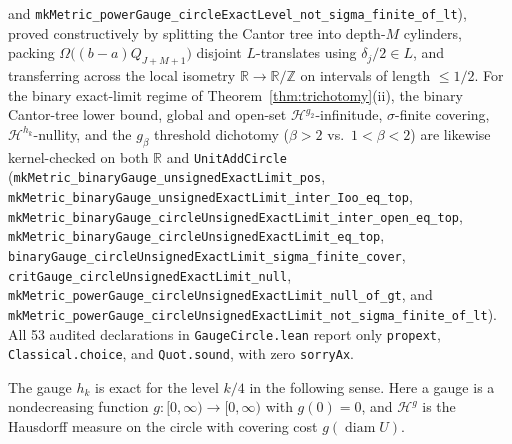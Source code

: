 \documentclass[11pt]{article}
\theoremstyle{definition}
\theoremstyle{remark}
\newcommand{\R}{\mathbb{R}}
\newcommand{\Z}{\mathbb{Z}}
\begin{document}
and
\texttt{mkMetric\_\allowbreak powerGauge\_\allowbreak circleExactLevel\_\allowbreak not\_\allowbreak sigma\_\allowbreak finite\_\allowbreak of\_\allowbreak lt}),
proved constructively by splitting the Cantor tree into depth-$M$ cylinders,
packing $\Omega\bigl((b-a)Q_{J+M+1}\bigr)$ disjoint $L$-translates using
$\delta_j/2\in L$, and transferring across the local isometry
$\R\to\R/\Z$ on intervals of length $\le1/2$. For the binary exact-limit
regime of Theorem~\ref{thm:trichotomy}(ii), the binary Cantor-tree lower bound,
global and open-set $\mathcal H^{g_2}$-infinitude, $\sigma$-finite covering,
$\mathcal H^{h_k}$-nullity, and the $g_\beta$ threshold dichotomy ($\beta>2$ vs.\
$1<\beta<2$) are likewise kernel-checked on both $\R$ and \texttt{UnitAddCircle}
(\texttt{mkMetric\_\allowbreak binaryGauge\_\allowbreak unsigned\allowbreak ExactLimit\_\allowbreak pos},
\texttt{mkMetric\_\allowbreak binaryGauge\_\allowbreak unsigned\allowbreak ExactLimit\_\allowbreak inter\_\allowbreak Ioo\_\allowbreak eq\_\allowbreak top},
\texttt{mkMetric\_\allowbreak binaryGauge\_\allowbreak circle\allowbreak Unsigned\allowbreak ExactLimit\_\allowbreak inter\_\allowbreak open\_\allowbreak eq\_\allowbreak top},
\texttt{mkMetric\_\allowbreak binaryGauge\_\allowbreak circle\allowbreak Unsigned\allowbreak ExactLimit\_\allowbreak eq\_\allowbreak top},
\texttt{binaryGauge\_\allowbreak circle\allowbreak Unsigned\allowbreak ExactLimit\_\allowbreak sigma\_\allowbreak finite\_\allowbreak cover},
\texttt{critGauge\_\allowbreak circle\allowbreak Unsigned\allowbreak ExactLimit\_\allowbreak null},
\texttt{mkMetric\_\allowbreak powerGauge\_\allowbreak circle\allowbreak Unsigned\allowbreak ExactLimit\_\allowbreak null\_\allowbreak of\_\allowbreak gt},
and
\texttt{mkMetric\_\allowbreak powerGauge\_\allowbreak circle\allowbreak Unsigned\allowbreak ExactLimit\_\allowbreak not\_\allowbreak sigma\_\allowbreak finite\_\allowbreak of\_\allowbreak lt}).
All 53 audited declarations in \texttt{GaugeCircle.lean} report only
\texttt{propext}, \texttt{Classical.choice}, and \texttt{Quot.sound}, with zero
\texttt{sorryAx}.

The gauge $h_k$ is exact for the level $k/4$ in the following sense.
Here a gauge is a nondecreasing function $g:[0,\infty)\to[0,\infty)$
with $g(0)=0$, and $\mathcal H^g$ is the Hausdorff measure on the circle
with covering cost $g(\operatorname{diam}U)$.
\end{document}
